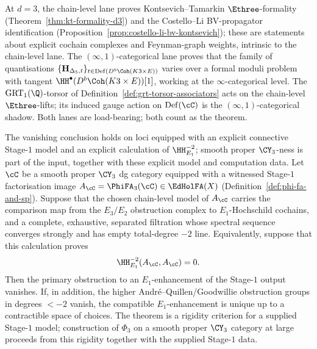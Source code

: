 \begin{remark}
\label{rem:two-grammars-separate-theorems}
At $d = 3$, the chain-level lane proves Kontsevich--Tamarkin
$\Ethree$-formality (Theorem~\ref{thm:kt-formality-d3}) and the
Costello--Li BV-propagator identification
(Proposition~\ref{prop:costello-li-bv-kontsevich}); these are statements
about explicit cochain complexes and Feynman-graph weights, intrinsic
to the chain-level lane. The $(\infty,1)$-categorical lane proves that
the family of quantisations
$\{\mathbf H_{\Delta_5,t}\}_{t\in\mathrm{Def}(D^b\Coh(K3\times E))}$
varies over a formal moduli problem with tangent
$\HH^\bullet(D^b\Coh(K3\times E))[1]$, working at the
$\infty$-categorical level. The $\mathrm{GRT}_1(\Q)$-torsor of
Definition~\ref{def:grt-torsor-associators} acts on the chain-level
$\Ethree$-lifts; its induced gauge action on $\mathrm{Def}(\cC)$ is the
$(\infty,1)$-categorical shadow. Both lanes are load-bearing; both
count as the theorem.
\end{remark}

\begin{theorem}
\label{thm:hh-minus-2-vanishing-cy3-rigidity}
The vanishing conclusion holds on loci equipped with an explicit
connective Stage-$1$ model and an explicit calculation of
$\HH^{-2}_{E_1}$; smooth proper $\CY_3$-ness is part of the input,
together with these explicit model and computation data.
Let $\cC$ be a smooth proper $\CY_3$ dg category equipped with a
witnessed Stage-$1$ factorisation image
$A_\cC=\PhiFA_3(\cC)\in\EdHolFA(X)$
(Definition~\ref{def:phi-fa-and-sp}). Suppose that the chosen
chain-level model of $A_\cC$ carries the comparison map from the
$E_3/E_2$ obstruction complex to $E_1$-Hochschild cochains, and a
complete, exhaustive, separated filtration whose spectral sequence
converges strongly and has empty total-degree $-2$ line. Equivalently,
suppose that this calculation proves
\begin{equation}
\label{eq:hh-minus-2-vanishing}
 \HH^{-2}_{E_1}(A_\cC,A_\cC)=0.
\end{equation}
Then the primary obstruction to an $E_1$-enhancement of the Stage-$1$
output vanishes. If, in addition, the higher Andr\'e--Quillen/Goodwillie
obstruction groups in degrees $< -2$ vanish, the compatible
$E_1$-enhancement is unique up to a contractible space of choices.
The theorem is a rigidity criterion for a supplied Stage-$1$ model;
construction of $\Phi_3$ on a smooth proper $\CY_3$ category at large
proceeds from this rigidity together with the supplied Stage-$1$ data.
\end{theorem}

